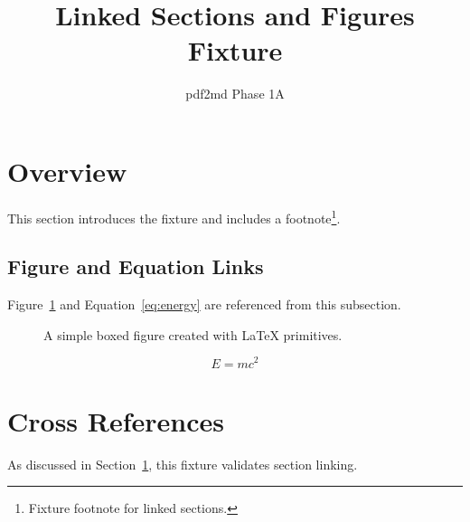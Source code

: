 \documentclass{article}
\title{Linked Sections and Figures Fixture}
\author{pdf2md Phase 1A}
\date{}
\begin{document}
\maketitle

\section{Overview}\label{sec:overview}
This section introduces the fixture and includes a footnote\footnote{Fixture footnote for linked sections.}.

\subsection{Figure and Equation Links}\label{sec:links}
Figure~\ref{fig:box-diagram} and Equation~\ref{eq:energy} are referenced from this subsection.

\begin{figure}[h]
\centering
\fbox{\rule{0pt}{1.2in}\rule{2.0in}{0pt}}
\caption{A simple boxed figure created with LaTeX primitives.}
\label{fig:box-diagram}
\end{figure}

\begin{equation}
E = mc^2
\label{eq:energy}
\end{equation}

\section{Cross References}\label{sec:cross}
As discussed in Section~\ref{sec:overview}, this fixture validates section linking.
\end{document}

